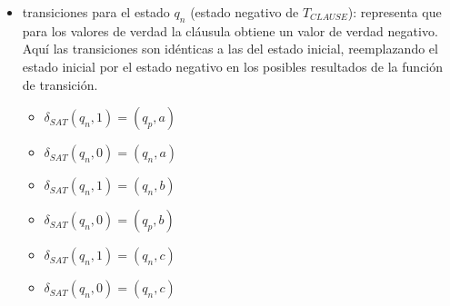 \documentclass[12pt]{article}
\begin{document}
\begin{itemize}
          \begin{multicols}{2}
              \begin{itemize}
                  \item $\delta_{SAT}(q_{p},1)=(q_{p},a)$
                  \item $\delta_{SAT}(q_{p},0)=(q_{p},a)$
                  \item $\delta_{SAT}(q_{p},1)=(q_{p},b)$
                  \item $\delta_{SAT}(q_{p},0)=(q_{p},b)$
                  \item $\delta_{SAT}(q_{p},1)=(q_{p},c)$
                  \item $\delta_{SAT}(q_{p},0)=(q_{p},c)$
              \end{itemize}
          \end{multicols}
          
    \item  transiciones para el estado $q_n$ (estado negativo de $T_{CLAUSE}$): representa que para los valores de verdad la cláusula obtiene un valor de verdad negativo.
          Aquí las transiciones son idénticas a las del estado inicial, reemplazando el estado inicial por el estado negativo en los posibles resultados
          de la función de transición.       
          
          \begin{multicols}{2}
              \begin{itemize}
                  \item $\delta_{SAT}(q_{n},1)=(q_{p},a)$
                  \item $\delta_{SAT}(q_{n},0)=(q_{n},a)$
                  \item $\delta_{SAT}(q_{n},1)=(q_{n},b)$
                  \item $\delta_{SAT}(q_{n},0)=(q_{p},b)$
                  \item $\delta_{SAT}(q_{n},1)=(q_{n},c)$
                  \item $\delta_{SAT}(q_{n},0)=(q_{n},c)$
              \end{itemize}
          \end{multicols}
\end{itemize}
\end{document}
